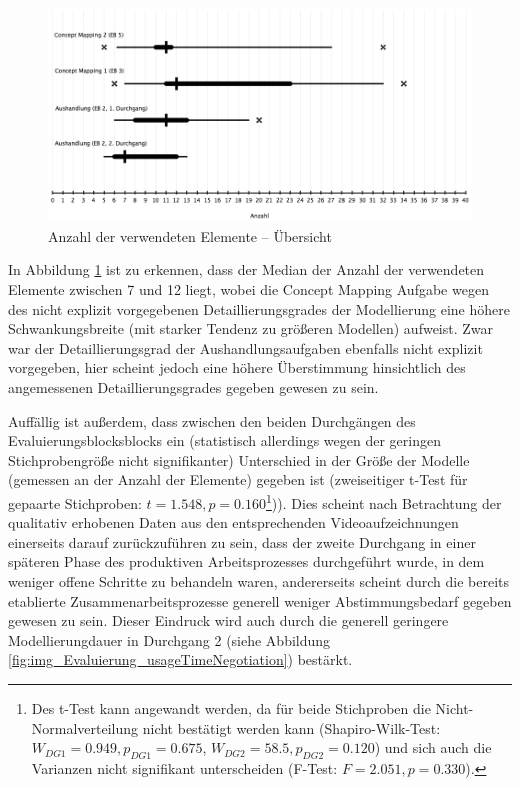 \begin{figure}[htbp]
	\centering
		\includegraphics[width=15cm]{img/Evaluierung/elementUsageBlocksOverview.png}
	\caption{Anzahl der verwendeten Elemente -- Übersicht}
	\label{fig:img_Evaluierung_elementUsageBlocksOverview}
\end{figure}

In Abbildung \ref{fig:img_Evaluierung_elementUsageBlocksOverview} ist zu erkennen, dass der Median der Anzahl der verwendeten Elemente zwischen 7 und 12 liegt, wobei die Concept Mapping Aufgabe wegen des nicht explizit vorgegebenen Detaillierungsgrades der Modellierung eine höhere Schwankungsbreite (mit starker Tendenz zu größeren Modellen) aufweist. Zwar war der Detaillierungsgrad der Aushandlungsaufgaben ebenfalls nicht explizit vorgegeben, hier scheint jedoch eine höhere Überstimmung hinsichtlich des angemessenen Detaillierungsgrades gegeben gewesen zu sein. 

Auffällig ist außerdem, dass zwischen den beiden Durchgängen des Evaluierungsblocksblocks ein (statistisch allerdings wegen der geringen Stichprobengröße nicht signifikanter) Unterschied in der Größe der Modelle (gemessen an der Anzahl der Elemente) gegeben ist (zweiseitiger t-Test für gepaarte Stichproben: $t=1.548, p=0.160$\footnote{Des t-Test kann angewandt werden, da für beide Stichproben die Nicht-Normalverteilung nicht bestätigt werden kann (Shapiro-Wilk-Test: $W_{DG1}=0.949, p_{DG1}=0.675$, $W_{DG2}=58.5, p_{DG2}=0.120$) und sich auch die Varianzen nicht signifikant unterscheiden (F-Test: $F=2.051, p=0.330$).})). Dies scheint nach Betrachtung der qualitativ erhobenen Daten aus den entsprechenden Videoaufzeichnungen einerseits darauf zurückzuführen zu sein, dass der zweite Durchgang in einer späteren Phase des produktiven Arbeitsprozesses durchgeführt wurde, in dem weniger offene Schritte zu behandeln waren, andererseits scheint durch die bereits etablierte Zusammenarbeitsprozesse generell weniger Abstimmungsbedarf gegeben gewesen zu sein. Dieser Eindruck wird auch durch die generell geringere Modellierungdauer in Durchgang 2 (siehe Abbildung \ref{fig:img_Evaluierung_usageTimeNegotiation}) bestärkt.

